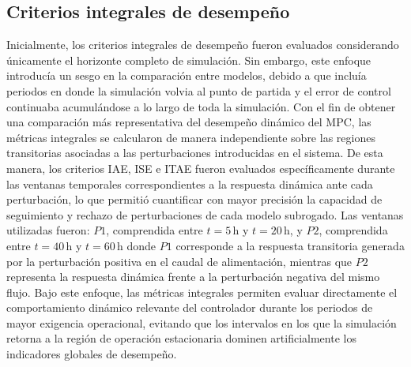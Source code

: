 \subsection{Criterios integrales de desempeño}

Inicialmente, los criterios integrales de desempeño fueron evaluados considerando únicamente el horizonte completo de simulación. Sin embargo, este enfoque introducía un sesgo en la comparación entre modelos, debido a que incluía periodos en donde la simulación volvia al punto de partida y el error de control continuaba acumulándose a lo largo de toda la simulación. Con el fin de obtener una comparación más representativa del desempeño dinámico del MPC, las métricas integrales se calcularon de manera independiente sobre las regiones transitorias asociadas a las perturbaciones introducidas en el sistema. De esta manera, los criterios IAE, ISE e ITAE fueron evaluados específicamente durante las ventanas temporales correspondientes a la respuesta dinámica ante cada perturbación, lo que permitió cuantificar con mayor precisión la capacidad de seguimiento y rechazo de perturbaciones de cada modelo subrogado. Las ventanas utilizadas fueron: \(P1\), comprendida entre \(t=5\,\mathrm{h}\) y \(t=20\,\mathrm{h}\), y \(P2\), comprendida entre \(t=40\,\mathrm{h}\) y \(t=60\,\mathrm{h}\) donde \(P1\) corresponde a la respuesta transitoria generada por la perturbación positiva en el caudal de alimentación, mientras que \(P2\) representa la respuesta dinámica frente a la perturbación negativa del mismo flujo. Bajo este enfoque, las métricas integrales permiten evaluar directamente el comportamiento dinámico relevante del controlador durante los periodos de mayor exigencia operacional, evitando que los intervalos en los que la simulación retorna a la región de operación estacionaria dominen artificialmente los indicadores globales de desempeño.

